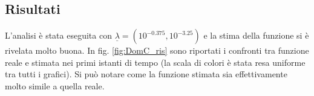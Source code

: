 \documentclass[a4paper,11pt,twoside,openright]{book}							%
\begin{document}
\subsection{Risultati}
L'analisi è stata eseguita con $\underline \lambda = (10^{-0.375}, 10^{-3.25})$ e la stima della funzione si è rivelata molto buona. In fig. \ref{fig:DomC_ris} sono riportati i confronti tra funzione reale e stimata nei primi istanti di tempo (la scala di colori è stata resa uniforme tra tutti i grafici). Si può notare come la funzione stimata sia effettivamente molto simile a quella reale.
\newpage
\begin{figure}[H]
\centering
\end{figure}
\end{document}
